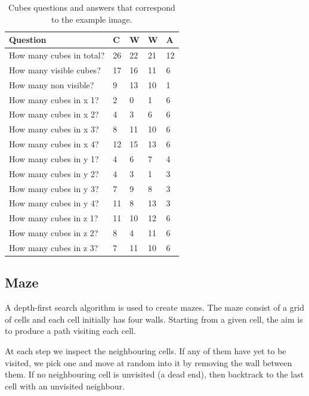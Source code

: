 \documentclass[11pt]{article}
\begin{document}
\begin{table}[ht]
\centering
\begin{tabular}{lllll}
\toprule
Question                     & C       & W     & W & A    \\ \midrule
How many cubes in total?     & 26      & 22     & 21 & 12     \\
How many visible cubes?      & 17      & 16     & 11 & 6     \\
How many non visible?  & 9       & 13     & 10  & 1    \\ \midrule
How many cubes in x 1? & 2       & 0      & 1  & 6     \\
How many cubes in x 2? & 4       & 3      & 6 & 6      \\
How many cubes in x 3? & 8       & 11     & 10 & 6     \\
How many cubes in x 4? & 12      & 15     & 13 & 6     \\ \midrule
How many cubes in y 1? & 4       & 6      & 7  & 4     \\
How many cubes in y 2? & 4       & 3      & 1   & 3    \\
How many cubes in y 3? & 7       & 9      & 8  & 3     \\
How many cubes in y 4? & 11      & 8      & 13 & 3     \\ \midrule
How many cubes in z 1? & 11      & 10     & 12 & 6     \\
How many cubes in z 2? & 8       & 4      & 11 & 6     \\
How many cubes in z 3? & 7       & 11     & 10  & 6    \\ \bottomrule
\end{tabular}
\caption{Cubes questions and answers that correspond to the example image.}
\label{tab:cubes_example}
\end{table}

\subsection{Maze}

A depth-first search algorithm is used to create mazes. The maze consist of a grid of cells and each cell initially has four walls. Starting from a given cell, the aim is to produce a path visiting each cell.

At each step we inspect the neighbouring cells. If any of them have yet to be visited, we pick one and move at random into it by removing the wall between them. If no neighbouring cell is unvisited (a dead end), then backtrack to the last cell with an unvisited neighbour.
\end{document}
